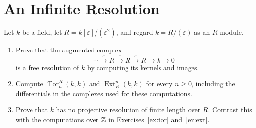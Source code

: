 \documentclass[11pt]{article}
\DeclareMathOperator{\Tor}{Tor}
\DeclareMathOperator{\Ext}{Ext}
\begin{document}
\section{An Infinite Resolution}\label{ex:periodic}
Let $k$ be a field, let $R=k[\varepsilon]/(\varepsilon^2)$, and regard
$k=R/(\varepsilon)$ as an $R$-module.
\begin{enumerate}
\item Prove that the augmented complex
\[
\cdots\xrightarrow{\varepsilon}R\xrightarrow{\varepsilon}R
\xrightarrow{\varepsilon}R\longrightarrow k\longrightarrow0
\]
is a free resolution of $k$ by computing its kernels and images.
\item Compute $\Tor_n^R(k,k)$ and $\Ext_R^n(k,k)$ for every $n\geq0$,
including the differentials in the complexes used for these computations.
\item Prove that $k$ has no projective resolution of finite length over $R$.
Contrast this with the computations over $\mathbb Z$ in
Exercises~\ref{ex:tor} and~\ref{ex:ext}.
\end{enumerate}
\end{document}
